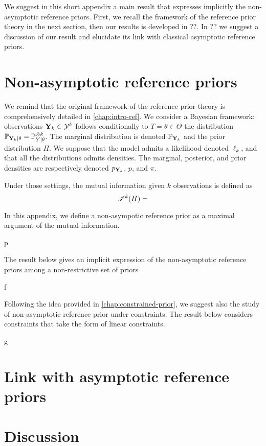 We suggest in this short appendix a main result that expresses implicitly the non-asymptotic reference priors. First, we recall the framework of the reference prior theory in the next section, then our results is developed in ??.
In ?? we suggest a discussion of our result and elucidate its link with classical asymptotic reference priors.




\section{Non-asymptotic reference priors}

We remind that the original framework of the reference prior theory is comprehensively detailed in \cref{chap:intro-ref}. We consider a Bayesian framework: observations $\mathbf{Y}_k\in\mathcal{Y}^k$ follows conditionally to $T=\theta\in\Theta$ the distribution $\mathbb{P}_{\mathbf{Y}_k|\theta}=\mathbb{P}_{Y|\theta}^{\otimes k}$. The marginal distribution is denoted  $\mathbb{P}_{\mathbf{Y}_k}$ and the prior distribution $\varPi$.
We suppose that the model admits a likelihood denoted $\ell_k$, and that all the distributions admits densities. The marginal, posterior, and prior densities are respectively denoted $p_{\mathbf{Y}_k}$, $p$, and $\pi$.

Under those settings, the mutual information given $k$ observations is defined as
    \begin{equation}
        \mathscr{I}^k(\varPi) =
    \end{equation}

In this appendix, we define a non-asympotic reference prior as a maximal argument of the mutual information.
\begin{defi}
    p
\end{defi}


The result below gives an implicit expression of the non-asymptotic reference priors among a non-restrictive set of priors

\begin{thm}
    f
\end{thm}


Following the idea provided in \cref{chap:constrained-prior}, we suggest also the study of non-asymptotic reference prior under constraints. The result below considers constraints that take the form of linear constraints. 


\begin{thm}
    g
\end{thm}







\section{Link with asymptotic reference priors}







\section{Discussion}






